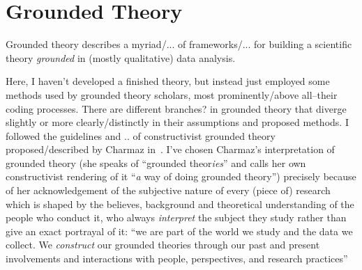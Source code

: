 \begin{comment}
vgl \cite{GeiHal2017}
iterative mixed method
combination of:
* quantitative methods: mining big data sets/computational social science
"begin with one or
more large (but often thin) datasets generated by a software platform, which has recorded digital
traces that users leave in interacting on that platform. Such researchers then seek to mine as much
signal and significance from these found datasets as they can at scale in order to answer a research
question"
* more traditional social science/qualitative methods, e.g. interviews, observations, experiments

\cite{Geiger2014}
"the idea that Wikipedia only takes place on wiki-
pedia.org – or even entirely on the Internet – is a huge misunderstanding (Konieczny, 2009;
Reagle, 2010). Wikipedia is not a virtual world, especially one located entirely on the wiki."
e.g. in order to get hold of abuse_filter_history I had to engage with
- wikipedia.org
- mediawiki.org
- irc channels
- phabricator
- gerrit
- toolserver/cloudservices
----
other spaces Wikipedia takes place
- mailinglists
- WomenEdit/offenes Editieren @Wikimedia
- Wikimania
- Wikimedia's office and daily work
\end{comment}

\section{Grounded Theory}

Grounded theory describes a myriad/... of frameworks/... for building a scientific theory \emph{grounded} in (mostly qualitative) data analysis.

Here, I haven't developed a finished theory,
but instead just employed some methods used by grounded theory %
scholars, most prominently/above all–their coding processes.
There are different branches? in grounded theory that diverge slightly or more clearly/distinctly in their assumptions and proposed methods.
I followed the guidelines and .. of constructivist grounded theory proposed/described by Charmaz in~\cite{Charmaz2006}.
I've chosen Charmaz's interpretation of grounded theory (she speaks of ``grounded theor\emph{ies}'' and calls her own constructivist rendering of it ``\emph{a} way of doing grounded theory'') precisely because of her acknowledgement of the subjective nature of every (piece of) research which is shaped by the believes, background and theoretical understanding of the people who conduct it, who always \emph{interpret} the subject they study rather than give an exact portrayal of it:
``we are part of the world we study and the data we collect. We \textit{construct} our grounded theories through our past and present involvements and interactions with people, perspectives, and research practices''~\cite[p.10]{Charmaz2006}

